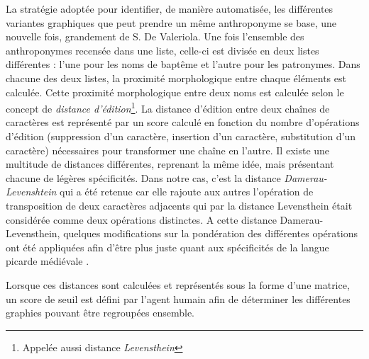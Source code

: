 La stratégie adoptée pour identifier, de manière automatisée, les différentes variantes graphiques que peut prendre un même anthroponyme se base, une nouvelle fois, grandement de S. De Valeriola. 
Une fois l'ensemble des anthroponymes recensée dans une liste, celle-ci est divisée en deux listes différentes : l'une pour les noms de baptême et l'autre pour les patronymes. Dans chacune des deux listes, la proximité morphologique entre chaque éléments est calculée. Cette proximité morphologique entre deux noms est calculée selon le concept de \textit{distance d'édition}\footnote{Appelée aussi distance \textit{Levensthein}}. 
La distance d'édition entre deux chaînes de caractères est représenté par un score calculé en fonction du nombre d'opérations d'édition (suppression d'un caractère, insertion d'un caractère, substitution d'un caractère) nécessaires pour transformer une chaîne en l'autre. Il existe une multitude de distances différentes, reprenant la même idée, mais présentant chacune de légères spécificités. 
Dans notre cas, c'est la distance \textit{Damerau-Levenshtein} qui a été retenue car elle rajoute aux autres l'opération de transposition de deux caractères adjacents qui par la distance Levensthein était considérée comme deux opérations distinctes. 
A cette distance Damerau-Levensthein, quelques modifications sur la pondération des différentes opérations ont été appliquées afin d'être plus juste quant aux spécificités de la langue picarde médiévale \parencite{de_valeriola_lordinateur_2021}.

Lorsque ces distances sont calculées et représentés sous la forme d'une matrice, un score de seuil est défini par l'agent humain afin de déterminer les différentes graphies pouvant être regroupées ensemble.  %


